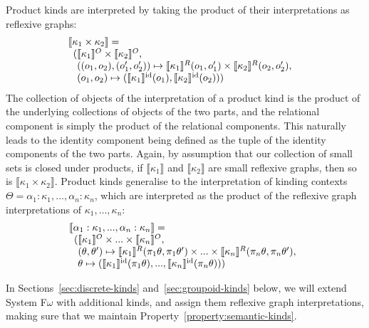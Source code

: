 \documentclass[preprint]{sigplanconf}
\theoremstyle{examplestyle}
\newcommand{\sem}[1]{\llbracket #1 \rrbracket}
\newcommand{\semKU}[1]{\llbracket #1 \rrbracket^O}
\newcommand{\semKR}[1]{\llbracket #1 \rrbracket^R}
\newcommand{\semKI}[1]{\llbracket #1 \rrbracket^{\mathrm{id}}}
\begin{document}
Product kinds are interpreted by taking the product of their
interpretations as reflexive graphs:
\begin{displaymath}
  \begin{array}{@{}l}
    \sem{\kappa_1 \times \kappa_2} = \\
    \begin{array}[t]{l@{}l}
      (& \semKU{\kappa_1} \times \semKU{\kappa_2}, \\
      & ((o_1,o_2),(o_1',o_2')) \mapsto \semKR{\kappa_1}(o_1,o_1') \times \semKR{\kappa_2}(o_2,o_2'), \\
      & (o_1,o_2) \mapsto (\semKI{\kappa_1}(o_1), \semKI{\kappa_2}(o_2)))
    \end{array}
  \end{array}
\end{displaymath}
The collection of objects of the interpretation of a product kind is
the product of the underlying collections of objects of the two parts,
and the relational component is simply the product of the relational
components. This naturally leads to the identity component being
defined as the tuple of the identity components of the two
parts. Again, by assumption that our collection of small sets is
closed under products, if $\sem{\kappa_1}$ and $\sem{\kappa_2}$ are
small reflexive graphs, then so is $\sem{\kappa_1 \times
  \kappa_2}$. Product kinds generalise to the interpretation of
kinding contexts $\Theta = \alpha_1 : \kappa_1, ..., \alpha_n :
\kappa_n$, which are interpreted as the product of the reflexive graph
interpretations of $\kappa_1, ..., \kappa_n$:
\begin{displaymath}
  \begin{array}{l}
    \sem{\alpha_1 : \kappa_1, ..., \alpha_n : \kappa_n} = \\
    \begin{array}[t]{l@{}l}
      (&\semKU{\kappa_1} \times ... \times \semKU{\kappa_n}, \\
      &(\theta,\theta') \mapsto \semKR{\kappa_1}(\pi_1\theta, \pi_1\theta') \times ... \times \semKR{\kappa_n}(\pi_n\theta, \pi_n\theta'), \\
      &\theta \mapsto (\semKI{\kappa_1}(\pi_1 \theta), ..., \semKI{\kappa_n}(\pi_n \theta)))
    \end{array}
  \end{array}
\end{displaymath}

In Sections~\ref{sec:discrete-kinds} and~\ref{sec:groupoid-kinds}
below, we will extend System F$\omega$ with additional kinds, and
assign them reflexive graph interpretations, making sure that we
maintain Property~\ref{property:semantic-kinds}.
\end{document}
